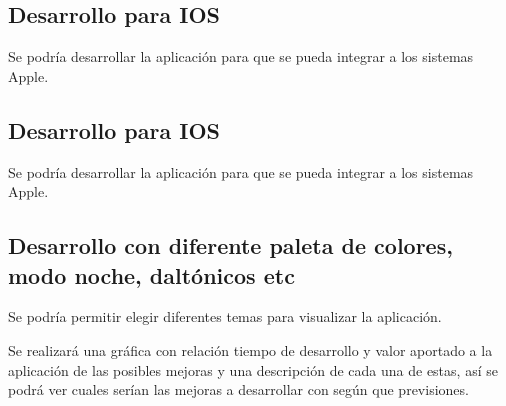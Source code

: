 \subsection{Desarrollo para IOS}
Se podría desarrollar la aplicación para que se pueda integrar a los sistemas Apple.

\subsection{Desarrollo para IOS}
Se podría desarrollar la aplicación para que se pueda integrar a los sistemas Apple.

\subsection{Desarrollo con diferente paleta de colores, modo noche, daltónicos etc}
Se podría permitir elegir diferentes temas para visualizar la aplicación.

Se realizará una gráfica con relación tiempo de desarrollo y valor aportado a la aplicación de las posibles mejoras y una descripción de cada una de estas, así se podrá ver cuales serían las mejoras a desarrollar con según que previsiones.